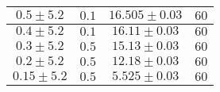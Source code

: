 \documentclass[../main.tex]{subfiles}
\begin{document}
\begin{tabular}{ ||c|c|c|c|| }
        \hline
        $0.5\pm 5.2$      & $0.1$       & $16.505\pm 0.03$  & $60$     \\
        \hline
        $0.4\pm 5.2$      & $0.1$       & $16.11\pm 0.03$   & $60$     \\
        \hline
        $0.3\pm 5.2$      & $0.5$       & $15.13\pm 0.03$   & $60$     \\
        \hline
        $0.2\pm 5.2$      & $0.5$       & $12.18\pm 0.03$   & $60$     \\
        \hline
        $0.15\pm 5.2$     & $0.5$       & $5.525\pm 0.03$   & $60$     \\
        \hline

    \end{tabular}
\end{document}
